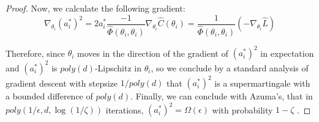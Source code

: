 \documentclass{article}
\begin{document}
\begin{proof}
Now, we calculate the following gradient: 
%
\begin{equation}
\nabla_{\theta_i} (a_i^*)^2 = 2a_i^*\frac{-1}{\widehat{\Phi}(\theta_i,\theta_i)} \nabla_{\theta_i} \widehat{C}(\theta_i) = \frac{1}{\widehat{\Phi}(\theta_i,\theta_i)} (-\nabla_{\theta_i} \widehat{L})
\end{equation}

Therefore, since $\theta_i$ moves in the direction of the gradient of $(a_i^*)^2$ in expectation and $(a_i^*)^2$ is $poly(d)$-Lipschitz in $\theta_i$, so we conclude by a standard analysis of gradient descent with stepsize $1/poly(d)$ that $(a_i^*)^2$ is a supermartingale with a bounded difference of $poly(d)$. Finally, we can conclude with Azuma's, that in $poly(1/\epsilon,d,\log(1/\zeta))$ iterations, $(a_i^*)^2 = \Omega(\epsilon)$ with probability $1-\zeta$ .
\end{proof}
\end{document}
